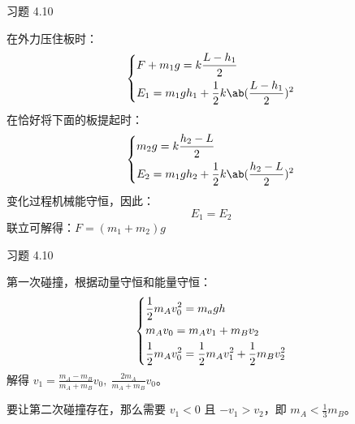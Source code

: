 \begin{problem}
    习题 4.10
    \begin{solution}
        在外力压住板时：
        $$
        \begin{dcases}
            F + m_1 g = k \frac{L - h_1}{2} \\
            E_1 = m_1 g h_1 + \frac{1}{2} k \ab(\frac{L - h_1}{2})^2 \\
        \end{dcases}
        $$
        在恰好将下面的板提起时：
        $$
        \begin{dcases}
            m_2 g = k \frac{h_2 - L}{2} \\
            E_2 = m_1 g h_2 + \frac{1}{2} k \ab(\frac{h_2 - L}{2})^2 \\
        \end{dcases}
        $$
        变化过程机械能守恒，因此：
        $$
        E_1 = E_2
        $$
        联立可解得：$F = (m_1 + m_2) g$
    \end{solution}
\end{problem}

\begin{problem}
    习题 4.10
    \begin{solution}
        第一次碰撞，根据动量守恒和能量守恒：
        $$
        \begin{dcases}
            \frac{1}{2} m_A v_0^2 = m_a g h \\
            m_A v_0 = m_A v_1 + m_B v_2 \\
            \frac{1}{2} m_A v_0^2 = \frac{1}{2} m_A v_1^2 + \frac{1}{2} m_B v_2^2
        \end{dcases}
        $$
        解得 $v_1 = \frac{m_A - m_B}{m_A + m_B} v_0,\ \frac{2 m_A}{m_A + m_B} v_0$。

        要让第二次碰撞存在，那么需要 $v_1 < 0$ 且 $-v_1 > v_2$，即 $m_A < \frac{1}{3} m_B$。
    \end{solution}
\end{problem}